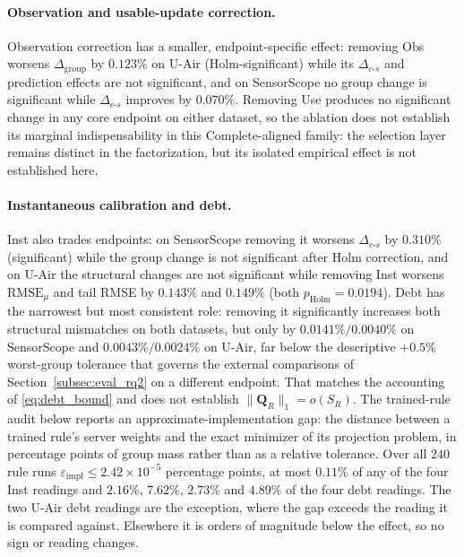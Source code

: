 \documentclass[letterpaper,journal]{IEEEtran}
\begin{document}
\paragraph{Observation and usable-update correction.}
Observation correction has a smaller, endpoint-specific effect: removing Obs
worsens $\Delta_{\mathrm{group}}$ by $0.123\%$ on U-Air (Holm-significant) while
its $\Delta_{c\text{-}s}$ and prediction effects are not significant, and on
SensorScope no group change is significant while $\Delta_{c\text{-}s}$ improves
by $0.070\%$.  Removing Use produces no significant change in any core endpoint
on either dataset, so the ablation does not establish its marginal
indispensability in this Complete-aligned family: the selection layer remains
distinct in the factorization, but its isolated empirical effect is not
established here.
\paragraph{Instantaneous calibration and debt.}
Inst also trades endpoints: on SensorScope removing it worsens
$\Delta_{c\text{-}s}$ by $0.310\%$ (significant) while the group change is not
significant after Holm correction, and on U-Air the structural changes are not
significant while removing Inst worsens $\mathrm{RMSE}_{\mu}$ and tail RMSE by
$0.143\%$ and $0.149\%$ (both $p_{\mathrm{Holm}}=0.0194$).  Debt has the
narrowest but most consistent role: removing it significantly increases both
structural mismatches on both datasets, but only by $0.0141\%/0.0040\%$ on
SensorScope and $0.0043\%/0.0024\%$ on U-Air, far below the descriptive
$+0.5\%$ worst-group tolerance that governs the external comparisons of
Section~\ref{subsec:eval_rq2} on a different endpoint.  That matches the
accounting of \eqref{eq:debt_bound} and does not establish
$\|\mathbf Q_R\|_1=o(S_R)$.  The trained-rule audit below reports an
approximate-implementation gap: the distance between a trained rule's server
weights and the exact minimizer of its projection problem, in percentage points
of group mass rather than as a relative tolerance.  Over all $240$ rule runs
$\varepsilon_{\mathrm{impl}}\le2.42\times10^{-5}$ percentage points, at most
$0.11\%$ of any of the four Inst readings and $2.16\%$, $7.62\%$, $2.73\%$ and
$4.89\%$ of the four debt readings.  The two U-Air debt readings are the
exception, where the gap exceeds the reading it is compared against.  Elsewhere
it is orders of magnitude below the effect, so no sign or reading changes.
\end{document}
